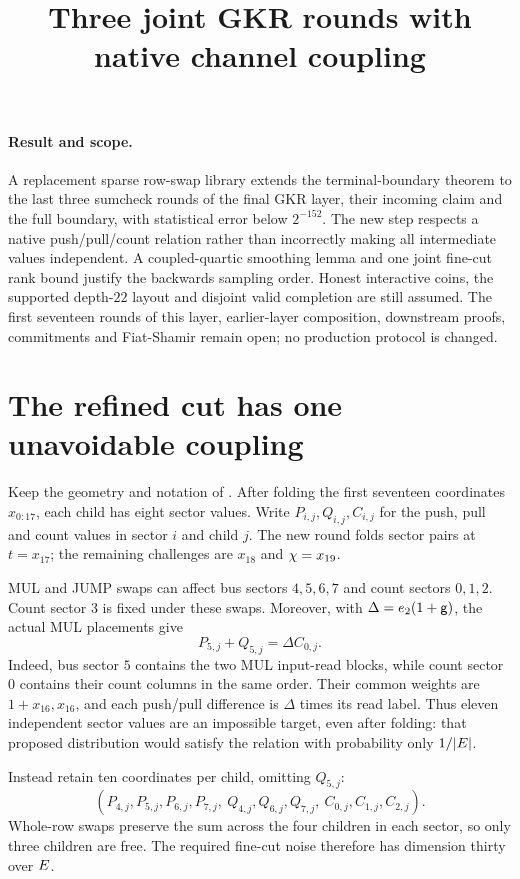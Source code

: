 \documentclass[11pt]{article}
\title{Three joint GKR rounds with native channel coupling}
\author{}
\date{}
\begin{document}
\maketitle
\vspace{-2em}

\paragraph{Result and scope.} A replacement sparse row-swap library extends the terminal-boundary theorem to the last three sumcheck rounds of the final GKR layer, their incoming claim and the full boundary, with statistical error below $2^{-152}$. The new step respects a native push/pull/count relation rather than incorrectly making all intermediate values independent. A coupled-quartic smoothing lemma and one joint fine-cut rank bound justify the backwards sampling order. Honest interactive coins, the supported depth-$22$ layout and disjoint valid completion are still assumed. The first seventeen rounds of this layer, earlier-layer composition, downstream proofs, commitments and Fiat-Shamir remain open; no production protocol is changed.

\section{The refined cut has one unavoidable coupling}

Keep the geometry and notation of . After folding the first seventeen coordinates $x_{0:17}$, each child has eight sector values. Write $P_{i,j},Q_{i,j},C_{i,j}$ for the push, pull and count values in sector $i$ and child $j$. The new round folds sector pairs at $t=x_{17}$; the remaining challenges are $x_{18}$ and $\chi=x_{19}$.

MUL and JUMP swaps can affect bus sectors $4,5,6,7$ and count sectors $0,1,2$. Count sector $3$ is fixed under these swaps. Moreover, with $\Delta=e_2(1+\mathsf{g})$, the actual MUL placements give
\[
 P_{5,j}+Q_{5,j}=\Delta C_{0,j}.
\]
Indeed, bus sector $5$ contains the two MUL input-read blocks, while count sector $0$ contains their count columns in the same order. Their common weights are $1+x_{16},x_{16}$, and each push/pull difference is $\Delta$ times its read label. Thus eleven independent sector values are an impossible target, even after folding: that proposed distribution would satisfy the relation with probability only $1/|E|$.

Instead retain ten coordinates per child, omitting $Q_{5,j}$:
\[
 (P_{4,j},P_{5,j},P_{6,j},P_{7,j},\ Q_{4,j},Q_{6,j},Q_{7,j},\ C_{0,j},C_{1,j},C_{2,j}).
\]
Whole-row swaps preserve the sum across the four children in each sector, so only three children are free. The required fine-cut noise therefore has dimension thirty over $E$.
\end{document}
